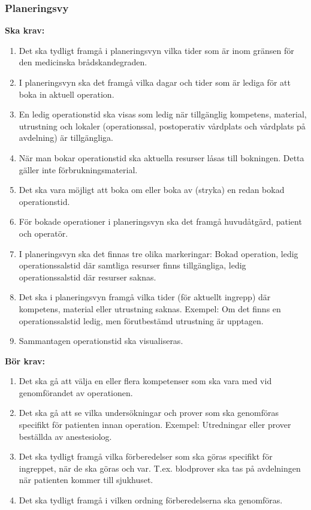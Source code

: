 \documentclass{article}
\begin{document}
\begin{enumerate}
\subsubsection{Planeringsvy}
\textbf{Ska krav: }
\begin{enumerate}
\item Det ska tydligt framgå i planeringsvyn vilka tider som är inom gränsen
för den medicinska brådskandegraden.
\item I planeringsvyn ska det framgå vilka dagar och tider som är lediga för
att boka in aktuell operation.
\item En ledig operationstid ska visas som ledig när tillgänglig kompetens,
material, utrustning och lokaler (operationssal, postoperativ vårdplats och
vårdplats på avdelning) är tillgängliga.
\item När man bokar operationstid ska aktuella resurser låsas till bokningen.
Detta gäller inte förbrukningsmaterial.
\item Det ska vara möjligt att boka om eller boka av (stryka) en redan bokad
operationstid.
\item För bokade operationer i planeringsvyn ska det framgå huvudåtgärd,
patient och operatör.
\item I planeringsvyn ska det finnas tre olika markeringar: Bokad operation,
ledig operationssalstid där samtliga resurser finns tillgängliga, ledig
operationssalstid där resurser saknas.
\item Det ska i planeringsvyn framgå vilka tider (för aktuellt ingrepp) där
kompetens, material eller utrustning saknas.
Exempel: Om det finns en operationssalstid ledig, men förutbestämd utrustning
är upptagen.
\item Sammantagen operationstid ska visualiseras.
\end{enumerate}
\textbf{Bör krav: }
\begin{enumerate}
\item Det ska gå att välja en eller flera kompetenser som ska vara med vid
genomförandet av operationen.
\item Det ska gå att se vilka undersökningar och prover som ska genomföras
specifikt för patienten innan operation. Exempel: Utredningar eller prover
beställda av anestesiolog.
\item Det ska tydligt framgå vilka förberedelser som ska göras specifikt för
ingreppet, när de ska göras och var. T.ex. blodprover ska tas på avdelningen
när patienten kommer till sjukhuset.
\item Det ska tydligt framgå i vilken ordning förberedelserna ska genomföras.

\end{enumerate}
\end{enumerate}
\end{document}
